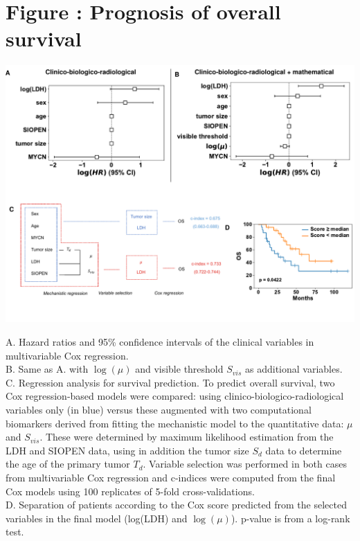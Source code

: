 \documentclass[11pt]{article}
\newcounter{fignb}  %
\begin{document}
\section{Figure : Prognosis of overall survival}
\spaceV
\begin{center}
\includegraphics[width=1\textwidth]{figure_5}
\end{center}
A. Hazard ratios and 95\% confidence intervals of the clinical variables in multivariable Cox regression. \\
B. Same as A. with $\log(\mu)$ and visible threshold $S_{vis}$ as additional variables.\\
C. Regression analysis for survival prediction. To predict overall survival, two Cox regression-based models were compared: using clinico-biologico-radiological variables only (in blue) versus these augmented with two computational biomarkers derived from fitting the mechanistic model to the quantitative data: $\mu$  and $S_{vis}$. These were determined by maximum likelihood estimation from the LDH and SIOPEN data, using in addition the tumor size $S_d$ data to determine the age of the primary tumor $T_d$. Variable selection was performed in both cases from multivariable Cox regression and c-indices were computed from the final Cox models using 100 replicates of 5-fold cross-validations.\\
D. Separation of patients according to the Cox score predicted from the selected variables in the final model (log(LDH) and $\log(\mu)$). p-value is from a log-rank test.
\end{document}
